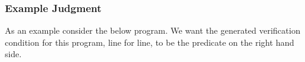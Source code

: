   














\subsubsection{Example Judgment}

As an example consider the below program. We want the generated verification condition for this program, line for line, to be the predicate on the right hand side.

